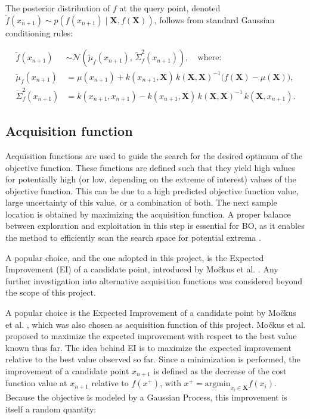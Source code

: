 \noindent The posterior distribution of $f$ at the query point, denoted 
$\tilde{f}(x_{n+1}) \sim p(f(x_{n+1})\mid\boldsymbol{X},f(\boldsymbol{X}))$, 
follows from standard Gaussian conditioning rules:

\begin{equation}\label{eq::GP_posterior}
\begin{aligned}
\tilde{f}(x_{n+1}) &\sim 
    \mathcal{N}\!\left(\tilde{\mu}_{f}(x_{n+1}),\, 
    \tilde{\Sigma}_{f}^2(x_{n+1})\right), \quad \text{where:} \\[6pt]
\tilde{\mu}_{f}(x_{n+1}) &= \mu(x_{n+1}) 
    + k(x_{n+1}, \mathbf{X})\,k(\mathbf{X}, \mathbf{X})^{-1}
    \bigl(f(\mathbf{X}) - \mu(\mathbf{X})\bigr), \\[4pt]
\tilde{\Sigma}_{f}^2(x_{n+1}) &= k(x_{n+1}, x_{n+1}) 
    - k(x_{n+1}, \mathbf{X})\,k(\mathbf{X}, \mathbf{X})^{-1}\,
    k(\mathbf{X}, x_{n+1}).
\end{aligned}
\end{equation}

\subsection{Acquisition function}\label{sec::acqfunc}
Acquisition functions are used to guide the search for the desired optimum of the objective function. These functions are defined such that they yield high values for potentially high (or low, depending on the extreme of interest) values of the objective function. This can be due to a high predicted objective function value, large uncertainty of this value, or a combination of both. The next sample location is obtained by maximizing the acquisition function. A proper balance between exploration and exploitation in this step is essential for BO, as it enables the method to efficiently scan the search space for potential extrema \cite{bo_tutorial}.

A popular choice, and the one adopted in this project, is the Expected Improvement (EI) of a candidate point, introduced by Mo\v{c}kus et al. \cite{Mockus1978}. Any further investigation into alternative acquisition functions was considered beyond the scope of this project. 

A popular choice is the Expected Improvement of a candidate point by Močkus et al. \cite{Mockus1978}, which was also chosen as acquisition function of this project. Močkus et al. proposed to maximize the expected improvement with respect to the best value known thus far. The idea behind EI is to maximize the expected improvement relative to the best value observed so far. Since a minimization is performed, the improvement of a candidate point $x_{n+1}$ is defined as the decrease of the cost function value at $x_{n+1}$ relative to $f(x^{+})$, with $x^+ = \text{argmin}_{x_i \in \boldsymbol{X}} f(x_i)$. Because the objective is modeled by a Gaussian Process, this improvement is itself a random quantity:

